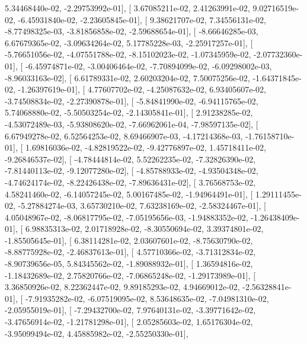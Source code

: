 \documentclass{article}
\begin{document}
          5.34468440e-02,  -2.29753992e-01],
       [  3.67085211e-02,   2.41263991e-02,   9.02716519e-02,
         -6.45931840e-02,  -2.23605845e-01],
       [  9.38621707e-02,   7.34556131e-02,  -8.77498325e-03,
         -3.81856858e-02,  -2.59688654e-01],
       [ -8.66646285e-03,   6.67679365e-02,  -3.09634264e-02,
          5.17785228e-03,  -2.25917257e-01],
       [ -5.76651056e-02,  -4.07551788e-02,  -8.15102023e-02,
         -1.07345959e-02,  -2.07732360e-01],
       [ -6.45974871e-02,  -3.00406464e-02,  -7.70894099e-02,
         -6.09298002e-03,  -8.96033163e-02],
       [  6.61789331e-02,   2.60203204e-02,   7.50075256e-02,
         -1.64371845e-02,  -1.26397619e-01],
       [  4.77607702e-02,  -4.25087632e-02,   6.93405607e-02,
         -3.74508834e-02,  -2.27390878e-01],
       [ -5.84841990e-02,  -6.94115765e-02,   5.74068880e-02,
         -5.50503254e-02,  -2.14305841e-01],
       [  2.91238285e-02,  -4.53072489e-03,  -5.93808620e-02,
         -7.66962061e-04,  -7.98597135e-02],
       [  6.67949278e-02,   6.52564253e-02,   8.69466907e-03,
         -4.17214368e-03,  -1.76158710e-01],
       [  1.69816036e-02,  -4.82819522e-02,  -9.42776897e-02,
          1.45718411e-02,  -9.26846537e-02],
       [ -4.78444814e-02,   5.52262235e-02,  -7.32826390e-02,
         -7.81440113e-02,  -9.12077280e-02],
       [ -4.85788933e-02,  -4.93504348e-02,  -4.74624174e-02,
         -8.22426438e-02,  -7.89636431e-02],
       [  3.76568753e-02,   4.58241460e-02,  -6.14057245e-02,
          5.00167485e-02,  -1.94964491e-01],
       [  1.29111455e-02,  -5.27884274e-03,   3.65730210e-02,
          7.63238169e-02,  -2.58324467e-01],
       [  4.05048967e-02,  -8.06817795e-02,  -7.05195656e-03,
         -1.94883352e-02,  -1.26438409e-01],
       [  6.98835313e-02,   2.01718928e-02,  -8.30550694e-02,
          3.39374801e-02,  -1.85505645e-01],
       [  6.38114281e-02,   2.03607601e-02,  -8.75630790e-02,
         -8.88775928e-02,  -2.46837613e-01],
       [  4.57710366e-02,  -3.71312834e-02,  -8.90739656e-05,
          5.84345562e-02,  -1.89088932e-01],
       [  1.36594816e-02,  -1.18432689e-02,   2.75820766e-02,
         -7.06865248e-02,  -1.29173989e-01],
       [  3.36850926e-02,   8.22362447e-02,   9.89185293e-02,
          4.94669012e-02,  -2.56328841e-01],
       [ -7.91935282e-02,  -6.07519095e-02,   8.53648635e-02,
         -7.04981310e-02,  -2.05955019e-01],
       [ -7.29432700e-02,   7.97640131e-02,  -3.39771642e-02,
         -3.47656914e-02,  -1.21781298e-01],
       [  2.05285603e-02,   1.65176304e-02,  -3.95099494e-02,
          4.45885982e-02,  -2.55250330e-01],
\end{document}
